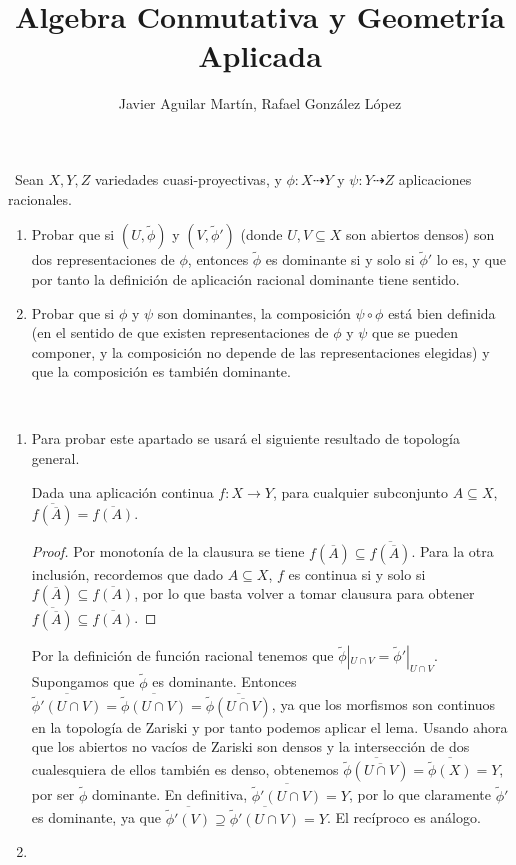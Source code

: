 \documentclass[twoside]{article}
\begin{document}
\title{Algebra Conmutativa y Geometría Aplicada}
\author{Javier Aguilar Martín, Rafael González López}
\maketitle

\begin{ejercicio}{1}\
Sean $X, Y,Z$ variedades cuasi-proyectivas, y $\phi : X \dashrightarrow Y$ y $\psi : Y \dashrightarrow Z$ aplicaciones racionales.
\begin{enumerate}
\item Probar que si $(U, \tilde{\phi})$ y $(V, \tilde{\phi}')$ (donde $U, V \subseteq X$ son abiertos densos) son
dos representaciones de $\phi$, entonces $\tilde{\phi}$ es dominante si y solo si $\tilde{\phi}'$ lo es, y
que por tanto la definición de aplicación racional dominante tiene sentido.
\item Probar que si $\phi$ y $\psi$ son dominantes, la composición  $\psi\circ\phi$ está bien definida
(en el sentido de que existen representaciones de $\phi$ y $\psi$ que se pueden
componer, y la composición no depende de las representaciones elegidas)
y que la composición es también dominante.
\end{enumerate}
\end{ejercicio}
\begin{solucion}\
\begin{enumerate}
\item Para probar este apartado se usará el siguiente resultado de topología general.
\begin{lemma} 
Dada una aplicación continua $f:X\to Y$, para cualquier subconjunto $A\subseteq X$, $\overline{f(\overline{A})}=\overline{f(A)}$. 
\end{lemma}
\begin{proof}
Por monotonía de la clausura se tiene $f(\overline{A})\subseteq\overline{f(\overline{A})}$. Para la otra inclusión, recordemos que dado $A\subseteq X$, $f$ es continua si y solo si $f(\overline{A})\subseteq\overline{f(A)}$, por lo que basta volver a tomar clausura para obtener $\overline{f(\overline{A})}\subseteq\overline{f(A)}$.
\end{proof}
 Por la definición de función racional tenemos que $\tilde{\phi}|_{U\cap V}=\tilde{\phi}'|_{U\cap V}$. Supongamos que $\tilde{\phi}$ es dominante. Entonces $\overline{\tilde{\phi}'(U\cap V)}=\overline{\tilde{\phi}(U\cap V)}=\overline{\tilde{\phi}(\overline{U\cap V})}$, ya que los morfismos son continuos en la topología de Zariski y por tanto podemos aplicar el lema. Usando ahora que los abiertos no vacíos de Zariski son densos y la intersección de dos cualesquiera de ellos también es denso, obtenemos $\overline{\tilde{\phi}(\overline{U\cap V})}=\overline{\tilde{\phi}(X)}=Y,$ por ser $\tilde{\phi}$ dominante. En definitiva, $\overline{\tilde{\phi}'(U\cap V)}=Y$, por lo que claramente $\tilde{\phi}'$ es dominante, ya que $\overline{\tilde{\phi}'(V)}\supseteq\overline{\tilde{\phi}'(U\cap V)}=Y$. El recíproco es análogo.
\item 
\end{enumerate}
\end{solucion}
\end{document}
